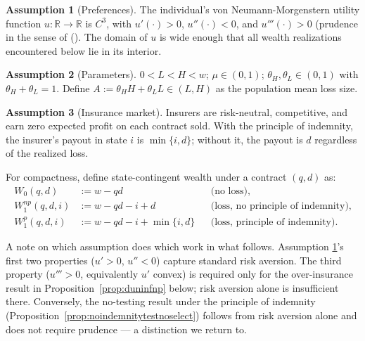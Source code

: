 \documentclass[natbib=false,preprint,12pt]{elsarticle}
\theoremstyle{plain}
\theoremstyle{definition}
\newtheorem{assumption}{Assumption}
\theoremstyle{plain}
\theoremstyle{TheoremNum}
\theoremstyle{CorollaryNum}
\theoremstyle{PropositionNum}
\theoremstyle{TheoremNum}
\begin{document}
\begin{assumption}[Preferences]\label{ass:preferences}
The individual's von Neumann-Morgenstern utility function $u : \mathbb{R} \to \mathbb{R}$ is $C^3$, with $u'(\cdot) > 0$, $u''(\cdot) < 0$, and $u'''(\cdot) > 0$ (prudence in the sense of \citeauthor{kimball1990precautionary} (\citeyear{kimball1990precautionary}). The domain of $u$ is wide enough that all wealth realizations encountered below lie in its interior.
\end{assumption}

\begin{assumption}[Parameters]\label{ass:parameters}
$0 < L < H < w$; $\mu \in (0,1)$; $\theta_H, \theta_L \in (0,1)$ with $\theta_H + \theta_L = 1$. Define $A := \theta_H H + \theta_L L \in (L,H)$ as the population mean loss size.
\end{assumption}

\begin{assumption}[Insurance market]\label{ass:market}
Insurers are risk-neutral, competitive, and earn zero expected profit on each contract sold. With the principle of indemnity, the insurer's payout in state $i$ is $\min\{i, d\}$; without it, the payout is $d$ regardless of the realized loss.
\end{assumption}

For compactness, define state-contingent wealth under a contract $(q,d)$ as:
\begin{align*}
W_0(q,d) &:= w - qd && \text{(no loss),} \\
W_1^{np}(q,d,i) &:= w - qd - i + d && \text{(loss, no principle of indemnity),} \\
W_1^{p}(q,d,i) &:= w - qd - i + \min\{i,d\} && \text{(loss, principle of indemnity).}
\end{align*}

A note on which assumption does which work in what follows. Assumption \ref{ass:preferences}'s first two properties ($u' > 0$, $u'' < 0$) capture standard risk aversion. The third property ($u''' > 0$, equivalently $u'$ convex) is required only for the over-insurance result in Proposition~\ref{prop:duninfnp} below; risk aversion alone is insufficient there. Conversely, the no-testing result under the principle of indemnity (Proposition~\ref{prop:noindemnitytestnoselect}) follows from risk aversion alone and does not require prudence --- a distinction we return to.
\end{document}
